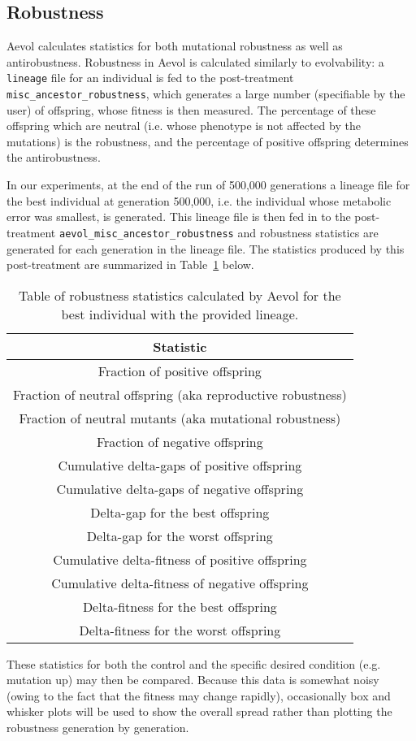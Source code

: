 \subsection{Robustness}
Aevol calculates statistics for both mutational robustness as well as antirobustness. Robustness in Aevol is calculated similarly to evolvability: a \texttt{lineage} file for an individual is fed to the post-treatment \texttt{misc\_ancestor\_robustness}, which generates a large number (specifiable by the user) of offspring, whose fitness is then measured. The percentage of these offspring which are neutral (i.e. whose phenotype is not affected by the mutations) is the robustness, and the percentage of positive offspring determines the antirobustness.

In our experiments, at the end of the run of 500,000 generations a lineage file for the best individual at generation 500,000, i.e. the individual whose metabolic error was smallest, is generated. This lineage file is then fed in to the post-treatment \texttt{aevol\_misc\_ancestor\_robustness} and robustness statistics are generated for each generation in the lineage file. The statistics produced by this post-treatment are summarized in Table~\ref{table:robustness} below.
\begin{table}[H]
	\centering
	\begin{tabular}{||c||}
		\hline
		\textbf{Statistic} \\
		\hline \hline
		Fraction of positive offspring \\
		\hline
		Fraction of neutral offspring (aka reproductive robustness) \\
		\hline
		Fraction of neutral mutants (aka mutational robustness) \\
		\hline
		Fraction of negative offspring \\
		\hline
		Cumulative delta-gaps of positive offspring \\
		\hline
		Cumulative delta-gaps of negative offspring \\
		\hline
		Delta-gap for the best offspring \\
		\hline
		Delta-gap for the worst offspring \\
		\hline
		Cumulative delta-fitness of positive offspring \\
		\hline
		Cumulative delta-fitness of negative offspring \\
		\hline
		Delta-fitness for the best offspring \\
		\hline
		Delta-fitness for the worst offspring \\
		\hline
		
	\end{tabular}
	\caption[Aevol robustness statistics]{Table of robustness statistics calculated by Aevol for the best individual with the provided lineage.}
	\label{table:robustness}
\end{table}
These statistics for both the control and the specific desired condition (e.g. mutation up) may then be compared. Because this data is somewhat noisy (owing to the fact that the fitness may change rapidly), occasionally box and whisker plots will be used to show the overall spread rather than plotting the robustness generation by generation. 
